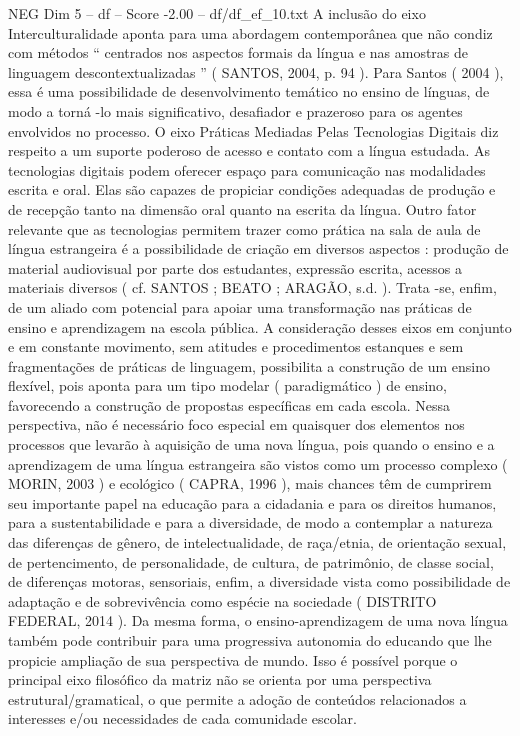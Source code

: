 \begin{textsample}{NEG Dim 5 – df – Score -2.00 – df/df\_ef\_10.txt}
A inclusão do eixo Interculturalidade aponta para uma abordagem contemporânea que não condiz com métodos “ centrados nos aspectos formais da língua e nas amostras de linguagem descontextualizadas ” ( SANTOS, 2004, p. 94 ).
Para Santos ( 2004 ), essa é uma possibilidade de desenvolvimento temático no ensino de línguas, de modo a torná -lo mais significativo, desafiador e prazeroso para os agentes envolvidos no processo.
O eixo Práticas Mediadas Pelas Tecnologias Digitais diz respeito a um suporte poderoso de acesso e contato com a língua estudada.
As tecnologias digitais podem oferecer espaço para comunicação nas modalidades escrita e oral.
Elas são capazes de propiciar condições adequadas de produção e de recepção tanto na dimensão oral quanto na escrita da língua.
Outro fator relevante que as tecnologias permitem trazer como prática na sala de aula de língua estrangeira é a possibilidade de criação em diversos aspectos : produção de material audiovisual por parte dos estudantes, expressão escrita, acessos a materiais diversos ( cf.
SANTOS ; BEATO ; ARAGÃO, s.d. ).
Trata -se, enfim, de um aliado com potencial para apoiar uma transformação nas práticas de ensino e aprendizagem na escola pública.
A consideração desses eixos em conjunto e em constante movimento, sem atitudes e procedimentos estanques e sem fragmentações de práticas de linguagem, possibilita a construção de um ensino flexível, pois aponta para um tipo modelar ( paradigmático ) de ensino, favorecendo a construção de propostas específicas em cada escola.
Nessa perspectiva, não é necessário foco especial em quaisquer dos elementos nos processos que levarão à aquisição de uma nova língua, pois quando o ensino e a aprendizagem de uma língua estrangeira são vistos como um processo complexo ( MORIN, 2003 ) e ecológico ( CAPRA, 1996 ), mais chances têm de cumprirem seu importante papel na educação para a cidadania e para os direitos humanos, para a sustentabilidade e para a diversidade, de modo a contemplar a natureza das diferenças de gênero, de intelectualidade, de raça/etnia, de orientação sexual, de pertencimento, de personalidade, de cultura, de patrimônio, de classe social, de diferenças motoras, sensoriais, enfim, a diversidade vista como possibilidade de adaptação e de sobrevivência como espécie na sociedade ( DISTRITO FEDERAL, 2014 ).
Da mesma forma, o ensino-aprendizagem de uma nova língua também pode contribuir para uma progressiva autonomia do educando que lhe propicie ampliação de sua perspectiva de mundo.
Isso é possível porque o principal eixo filosófico da matriz não se orienta por uma perspectiva estrutural/gramatical, o que permite a adoção de conteúdos relacionados a interesses e/ou necessidades de cada comunidade escolar.

\end{textsample}
